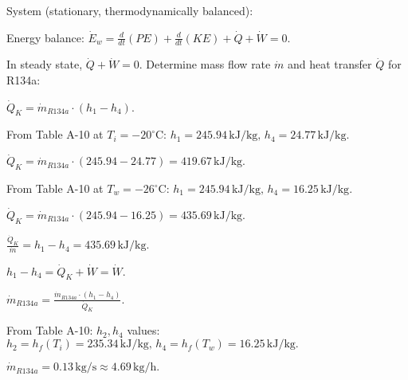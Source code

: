 System (stationary, thermodynamically balanced):  

Energy balance:  
\( \dot{E}_w = \frac{d}{dt}(PE) + \frac{d}{dt}(KE) + \dot{Q} + \dot{W} = 0 \).  

In steady state, \( \dot{Q} + \dot{W} = 0 \).  
Determine mass flow rate \( \dot{m} \) and heat transfer \( \dot{Q} \) for R134a:  

\( \dot{Q}_K = \dot{m}_{R134a} \cdot (h_1 - h_4) \).  

From Table A-10 at \( T_i = -20^\circ \text{C} \):  
\( h_1 = 245.94 \, \text{kJ/kg}, \, h_4 = 24.77 \, \text{kJ/kg} \).  

\( \dot{Q}_K = \dot{m}_{R134a} \cdot (245.94 - 24.77) = 419.67 \, \text{kJ/kg}. \)  

From Table A-10 at \( T_w = -26^\circ \text{C} \):  
\( h_1 = 245.94 \, \text{kJ/kg}, \, h_4 = 16.25 \, \text{kJ/kg}. \)  

\( \dot{Q}_K = \dot{m}_{R134a} \cdot (245.94 - 16.25) = 435.69 \, \text{kJ/kg}. \)  

\( \frac{\dot{Q}_K}{\dot{m}} = h_1 - h_4 = 435.69 \, \text{kJ/kg}. \)  

\( h_1 - h_4 = \dot{Q}_K + \dot{W} = \dot{W}. \)  

\( \dot{m}_{R134a} = \frac{\dot{m}_{R134a} \cdot (h_1 - h_4)}{\dot{Q}_K}. \)  

From Table A-10:  
\( h_2, h_4 \) values:  
\( h_2 = h_f(T_i) = 235.34 \, \text{kJ/kg}, \, h_4 = h_f(T_w) = 16.25 \, \text{kJ/kg}. \)  

\( \dot{m}_{R134a} = 0.13 \, \text{kg/s} \approx 4.69 \, \text{kg/h}. \)